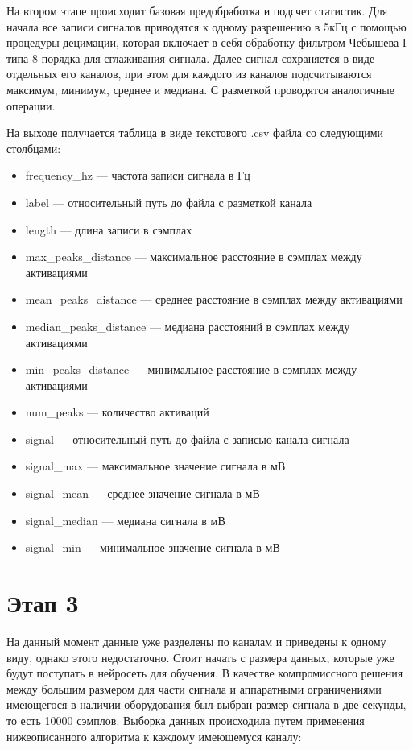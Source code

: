 На втором этапе происходит базовая предобработка и подсчет статистик. Для
начала все записи сигналов приводятся к одному разрешению в 5кГц с помощью
процедуры децимации, которая включает в себя обработку фильтром Чебышева I типа
8 порядка для сглаживания сигнала. Далее сигнал сохраняется в виде отдельных
его каналов, при этом для каждого из каналов подсчитываются максимум, минимум,
среднее и медиана. С разметкой проводятся аналогичные операции.

На выходе получается таблица в виде текстового .csv файла со следующими столбцами:

\begin{itemize}
	\item frequency\_hz --- частота записи сигнала в Гц
	\item label --- относительный путь до файла с разметкой канала
	\item length --- длина записи в сэмплах
	\item max\_peaks\_distance --- максимальное расстояние в сэмплах между активациями
	\item mean\_peaks\_distance --- среднее расстояние в сэмплах между активациями
	\item median\_peaks\_distance --- медиана расстояний в сэмплах между активациями
	\item min\_peaks\_distance --- минимальное расстояние в сэмплах между активациями
	\item num\_peaks --- количество активаций
	\item signal --- относительный путь до файла с записью канала сигнала
	\item signal\_max --- максимальное значение сигнала в мВ
	\item signal\_mean --- среднее значение сигнала в мВ
	\item signal\_median --- медиана сигнала	в мВ
	\item signal\_min --- минимальное значение сигнала в мВ
\end{itemize}

\section{Этап 3} На данный момент данные уже разделены по каналам и приведены к
одному виду, однако этого недостаточно. Стоит начать с размера данных, которые
уже будут поступать в нейросеть для обучения. В качестве компромиссного решения
между большим размером для части сигнала и аппаратными ограничениями имеющегося
в наличии оборудования был выбран размер сигнала в две секунды, то есть 10000
сэмплов. Выборка данных происходила путем применения нижеописанного алгоритма к
каждому имеющемуся каналу:

